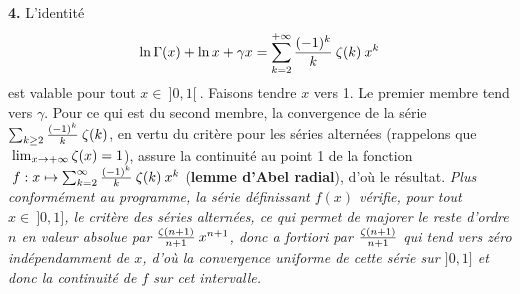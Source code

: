\documentclass{article}
\begin{document}
\msk
{\bf 4.} L'identit\'e\vv
$$\ln\Gamma(x)+\ln x+\gamma x=\sum_{k=2}^{+\infty}{(-1)^k\over k}\>\zeta(k)\>x^k$$
est valable pour tout $x\in\>]0,1[\>$. Faisons tendre $x$ vers 1. Le premier membre tend vers $\gamma$. Pour ce qui est du second membre, la convergence de la s\'erie $\sum_{k\geq2}{(-1)^k\over k}\>\zeta(k)$, en vertu du crit\`ere pour les s\'eries altern\'ees (rappelons que $\>\lim_{x\rightarrow+\infty}\zeta(x)=1$), assure la continuit\'e au point 1 de la fonction $\;f:x\mapsto\sum_{k=2}^{\infty}{(-1)^k\over k}\>\zeta(k)\>x^k$ ({\bf lemme d'Abel radial}), d'o\`u le r\'esultat.\msk\sect
{\it Plus conform\'ement au programme, la s\'erie d\'efinissant $f(x)$ v\'erifie, pour tout $x\in\>]0,1]$, le crit\`ere des s\'eries altern\'ees, ce qui permet de majorer le reste d'ordre $n$ en valeur absolue par ${\zeta(n+1)\over n+1}\>x^{n+1}$, donc a fortiori par ${\zeta(n+1)\over n+1}$ qui tend vers z\'ero ind\'ependamment de $x$, d'o\`u la convergence uniforme de cette s\'erie sur $]0,1]$ et donc la continuit\'e de $f$ sur cet intervalle.}
\end{document}
